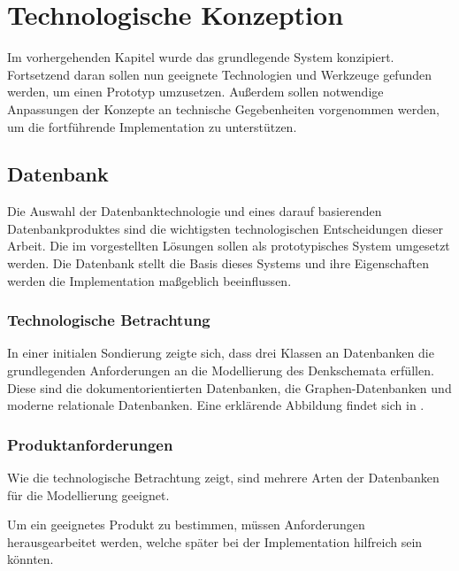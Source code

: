 \chapter{Technologische Konzeption}
\label{cha:tech}

Im vorhergehenden Kapitel wurde das grundlegende System konzipiert.
Fortsetzend daran sollen nun geeignete Technologien und Werkzeuge gefunden werden,
um einen Prototyp umzusetzen.
Außerdem sollen notwendige Anpassungen der Konzepte an technische Gegebenheiten vorgenommen werden,
um die fortf\"uhrende Implementation zu unterst\"utzen.





\section{Datenbank}
\label{sec:tech:db}

Die Auswahl der Datenbanktechnologie und eines darauf basierenden Datenbankproduktes sind die wichtigsten technologischen Entscheidungen dieser Arbeit.
Die im  vorgestellten Lösungen sollen als prototypisches System umgesetzt werden.
Die Datenbank stellt die Basis dieses Systems und ihre Eigenschaften werden die Implementation maßgeblich beeinflussen.


\subsection{Technologische Betrachtung}

In einer initialen Sondierung zeigte sich,
dass drei Klassen an Datenbanken die grundlegenden Anforderungen an die Modellierung des Denkschemata erfüllen.
Diese sind die dokumentorientierten Datenbanken, die Graphen-Datenbanken und moderne relationale Datenbanken. 
Eine erklärende Abbildung findet sich in .

\subsection{Produktanforderungen}

Wie die technologische Betrachtung zeigt,
sind mehrere Arten der Datenbanken für die Modellierung geeignet.

Um ein geeignetes Produkt zu bestimmen,
m\"ussen Anforderungen herausgearbeitet werden,
welche sp\"ater bei der Implementation hilfreich sein k\"onnten.

